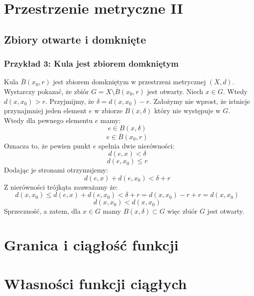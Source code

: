\documentclass{article}
\begin{document}
\section{Przestrzenie metryczne II}
\subsection{Zbiory otwarte i domknięte}
\newpage
\subsubsection{Przykład 3: Kula jest zbiorem domkniętym}

Kula \(\overline{B}(x_0 , r)\) jest zbiorem domkniętym w przestrzeni metrycznej \((X, d)\).
Wystarczy pokazać, że zbiór \(G = X \setminus \overline{B}(x_0 , r)\)
jest otwarty. Niech \(x \in G\). Wtedy \(d(x, x_0) > r\). Przyjmijmy, że \(\delta = d(x, x_0) - r\). 
Założymy nie wprost, że istnieje przynajmniej jeden element \(e\)
w zbiorze \(B(x, \delta)\) który nie występuje w \(G\). Wtedy dla pewnego elementu \(e\) mamy:
\begin{equation*}
    e \in B(x , \delta)
\end{equation*}
\begin{equation*}
    e \in \overline{B}(x_0 , r)
\end{equation*}
Oznacza to, że pewien punkt \(e\) spełnia dwie nierówności:
\begin{equation*}
    d(e, x) < \delta
\end{equation*}
\begin{equation*}
    d(e, x_0) \leq r 
\end{equation*}
Dodając je stronami otrzymujemy:
\begin{equation*}
    d(e, x) + d(e, x_0) < \delta + r
\end{equation*}
Z nierówności trójkąta zauważamy że:
\begin{equation*}
    d(x, x_0) \leq d(e, x) + d(e, x_0) < \delta + r = d(x, x_0) - r + r = d(x, x_0)
\end{equation*}
\begin{equation*}
    d(x, x_0) < d(x, x_0)
\end{equation*}
Sprzeczność, a zatem, dla \(x \in G\) mamy \(B(x, \delta) \subset G\) więc zbiór \(G\) jest otwarty.
\section{Granica i ciągłość funkcji}
\section{Własności funkcji ciągłych}
\end{document}
